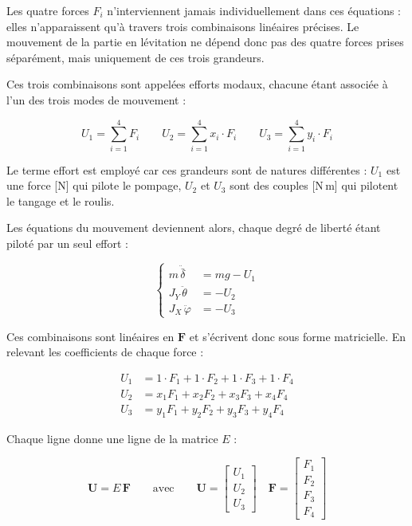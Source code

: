 Les quatre forces $F_i$ n'interviennent jamais individuellement dans ces équations : elles n'apparaissent qu'à travers trois combinaisons linéaires précises. Le mouvement de la partie en lévitation ne dépend donc pas des quatre forces prises séparément, mais uniquement de ces trois grandeurs.

Ces trois combinaisons sont appelées efforts modaux, chacune étant
associée à l'un des trois modes de mouvement :

\begin{equation*}
    U_1 = \sum_{i=1}^{4} F_i
    \qquad
    U_2 = \sum_{i=1}^{4} x_i\cdot F_i
    \qquad
    U_3 = \sum_{i=1}^{4} y_i\cdot F_i
\end{equation*}

Le terme effort est employé car ces grandeurs sont de natures différentes : $U_1$ est une force [N] qui pilote le pompage, $U_2$ et $U_3$ sont des couples [N\,m] qui pilotent le tangage et le roulis.

Les équations du mouvement deviennent alors, chaque degré de liberté étant piloté par un seul effort :

\begin{equation}
    \left\{
    \begin{aligned}
        m\,\ddot{\bar\delta} & = m g - U_1 \\
        J_Y\,\ddot\theta     & = - U_2     \\
        J_X\,\ddot\varphi    & = - U_3
    \end{aligned}
    \right.
\end{equation}

Ces combinaisons sont linéaires en $\boldsymbol{F}$ et s'écrivent donc sous forme matricielle. En relevant les coefficients de chaque force :

\begin{equation*}
    \begin{aligned}
        U_1 & = 1 \cdot F_1 + 1 \cdot F_2 + 1 \cdot F_3 + 1 \cdot F_4 \\
        U_2 & = x_1 F_1 + x_2 F_2 + x_3 F_3 + x_4 F_4                 \\
        U_3 & = y_1 F_1 + y_2 F_2 + y_3 F_3 + y_4 F_4
    \end{aligned}
\end{equation*}

Chaque ligne donne une ligne de la matrice $E$ :

\begin{equation}
    \boldsymbol{U} = E\,\boldsymbol{F}
    \qquad \text{avec} \qquad
    \boldsymbol{U} = \begin{bmatrix} U_1 \\ U_2 \\ U_3 \end{bmatrix}
    \quad
    \boldsymbol{F} = \begin{bmatrix} F_1 \\ F_2 \\ F_3 \\ F_4 \end{bmatrix}
\end{equation}


